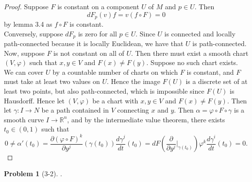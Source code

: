 \documentclass[reqno]{amsart}
\theoremstyle{plain}%
\theoremstyle{definition}
\newtheorem{problem}[theorem]{Problem}
\theoremstyle{remark}
\begin{document}
    \begin{proof}
        Suppose $F$ is constant on a component $U$ of $M$ and $p \in U$.
        Then 
        \[
        dF_p (v) f = v \left( f \circ F \right) = 0
        \] 
        by lemma 3.4 as $f \circ F$ is constant.\\
        Conversely, suppose $dF_p$ is zero for all $p \in U$. Since $U$ is
        connected and locally path-connected because it is locally Euclidean,
        we have that $U$ is path-connected. Now, suppose $F$ is not constant
        on all of $U$. Then there must exist a smooth chart $\left( V, \varphi \right) $ 
        such that $x,y \in V$ and $F(x) \neq F(y)$. Suppose no such chart
        exists. We can cover $U$ by a countable number of charts on which
        $F$ is constant, and $F$ must take at least two values on
        $U$. Hence the image $F(U)$ is a discrete set of at least two points,
        but also path-connected, which is impossible since  $F(U)$ is
        Hausdorff. Hence let $\left( V, \varphi \right) $ be a chart 
        with $x,y \in V$ and $F(x) \neq  F(y)$. Then
        let $\gamma  \colon I \to N$ be a path contained in $V$ connecting
        $x$ and $y$. Then $ \alpha  = \varphi \circ F \circ \gamma$ is a 
        smooth curve  $I \to \mathbb{R}^{n}$, and by the intermediate value
        theorem, there exists $t_0 \in \left( 0,1 \right) $ such that
        \[
        0 \neq \alpha' (t_0) =
        \frac{\partial \left( \varphi \circ F \right)^{k} }{\partial y^{j}} 
        (\gamma(t_0))
        \frac{d \gamma^{j}}{d t} (t_0)
        = d F \left( \frac{\partial}{\partial y^{j}}|_{\gamma(t_0)} \right)
        \varphi^{k} \frac{d \gamma^{i}}{dt}(t_0)
        = 0.
        \] 
    \end{proof}

    \begin{problem}[3-2]
        .
    \end{problem}
\end{document}
